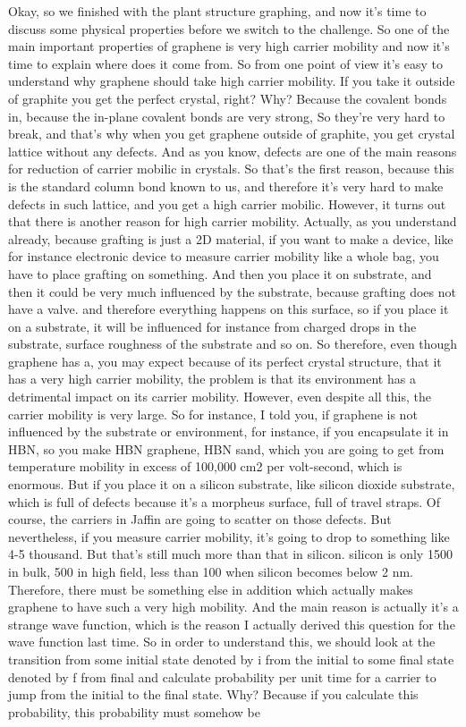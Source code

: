 Okay, so we finished with the plant structure graphing, and now it's time to discuss some physical properties before we switch to the challenge. So one of the main important properties of graphene is very high carrier mobility and now it's time to explain where does it come from. So from one point of view it's easy to understand why graphene should take high carrier mobility. If you take it outside of graphite you get the perfect crystal, right? Why? Because the covalent bonds in, because the in-plane covalent bonds are very strong, So they're very hard to break, and that's why when you get graphene outside of graphite, you get crystal lattice without any defects. And as you know, defects are one of the main reasons for reduction of carrier mobilic in crystals. So that's the first reason, because this is the standard column bond known to us, and therefore it's very hard to make defects in such lattice, and you get a high carrier mobilic. However, it turns out that there is another reason for high carrier mobility. Actually, as you understand already, because grafting is just a 2D material, if you want to make a device, like for instance electronic device to measure carrier mobility like a whole bag, you have to place grafting on something. And then you place it on substrate, and then it could be very much influenced by the substrate, because grafting does not have a valve. and therefore everything happens on this surface, so if you place it on a substrate, it will be influenced for instance from charged drops in the substrate, surface roughness of the substrate and so on. So therefore, even though graphene has a, you may expect because of its perfect crystal structure, that it has a very high carrier mobility, the problem is that its environment has a detrimental impact on its carrier mobility. However, even despite all this, the carrier mobility is very large. So for instance, I told you, if graphene is not influenced by the substrate or environment, for instance, if you encapsulate it in HBN, so you make HBN graphene, HBN sand, which you are going to get from temperature mobility in excess of 100,000 cm2 per volt-second, which is enormous. But if you place it on a silicon substrate, like silicon dioxide substrate, which is full of defects because it's a morpheus surface, full of travel straps. Of course, the carriers in Jaffin are going to scatter on those defects. But nevertheless, if you measure carrier mobility, it's going to drop to something like 4-5 thousand. But that's still much more than that in silicon. silicon is only 1500 in bulk, 500 in high field, less than 100 when silicon becomes below 2 nm. Therefore, there must be something else in addition which actually makes graphene to have such a very high mobility. And the main reason is actually it's a strange wave function, which is the reason I actually derived this question for the wave function last time. So in order to understand this, we should look at the transition from some initial state denoted by i from the initial to some final state denoted by f from final and calculate probability per unit time for a carrier to jump from the initial to the final state. Why? Because if you calculate this probability, this probability must somehow be 